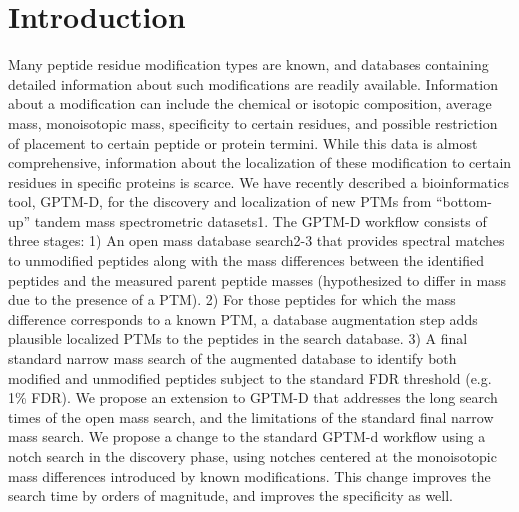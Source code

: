 \documentclass[journal=jprobs,manuscript=article]{achemso}
\begin{document}
\section{Introduction}
Many peptide residue modification types are known, and databases containing detailed information about such modifications are readily available. Information about a modification can include the chemical or isotopic composition, average mass, monoisotopic mass, specificity to certain residues, and possible restriction of placement to certain peptide or protein termini. While this data is almost comprehensive, information about the localization of these modification to certain residues in specific proteins is scarce. 
We have recently described a bioinformatics tool, GPTM-D, for the discovery and localization of new PTMs from “bottom-up” tandem mass spectrometric datasets1. The GPTM-D workflow consists of three stages: 1) An open mass database search2-3 that provides spectral matches to unmodified peptides along with the mass differences between the identified peptides and the measured parent peptide masses (hypothesized to differ in mass due to the presence of a PTM).  2) For those peptides for which the mass difference corresponds to a known PTM, a database augmentation step adds plausible localized PTMs to the peptides in the search database. 3) A final standard narrow mass search of the augmented database to identify both modified and unmodified peptides subject to the standard FDR threshold (e.g. 1\% FDR). 
We propose an extension to GPTM-D that addresses the long search times of the open mass search, and the limitations of the standard final narrow mass search. We propose a change to the standard GPTM-d workflow using a notch search in the discovery phase, using notches centered at the monoisotopic mass differences introduced by known modifications. This change improves the search time by orders of magnitude, and improves the specificity as well. 
\end{document}
